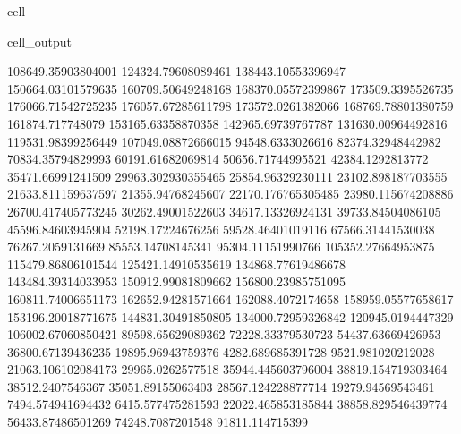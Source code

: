 \documentclass[letterpaper,10pt,english]{jupyterBook}
\begin{document}
\begin{sphinxuseclass}{cell}
\begin{sphinxVerbatimOutput}
\begin{sphinxuseclass}{cell_output}
\begin{sphinxVerbatim}[commandchars=\\\{\}]
108649.35903804001  124324.79608089461  138443.10553396947  150664.03101579635  160709.50649248168  168370.05572399867  173509.3395526735  176066.71542725235  176057.67285611798  173572.0261382066  168769.78801380759  161874.717748079  153165.63358870358  142965.69739767787  131630.00964492816  119531.98399256449  107049.08872666015  94548.6333026616  82374.32948442982  70834.35794829993  60191.61682069814  50656.71744995521  42384.1292813772  35471.66991241509  29963.302930355465  25854.96329230111  23102.898187703555  21633.811159637597  21355.94768245607  22170.176765305485  23980.115674208886  26700.417405773245  30262.49001522603  34617.13326924131  39733.84504086105  45596.84603945904  52198.17224676256  59528.46401019116  67566.31441530038  76267.2059131669  85553.14708145341  95304.11151990766  105352.27664953875  115479.86806101544  125421.14910535619  134868.77619486678  143484.39314033953  150912.99081809662  156800.23985751095  160811.74006651173  162652.94281571664  162088.4072174658  158959.05577658617  153196.20018771675  144831.30491850805  134000.72959326842  120945.0194447329  106002.67060850421  89598.65629089362  72228.33379530723  54437.63669426953  36800.67139436235  19895.96943759376  4282.689685391728  \PYGZhy{}9521.981020212028  \PYGZhy{}21063.106102084173  \PYGZhy{}29965.0262577518  \PYGZhy{}35944.445603796004  \PYGZhy{}38819.154719303464  \PYGZhy{}38512.2407546367  \PYGZhy{}35051.89155063403  \PYGZhy{}28567.124228877714  \PYGZhy{}19279.94569543461  \PYGZhy{}7494.574941694432  6415.577475281593  22022.465853185844  38858.829546439774  56433.87486501269  74248.7087201548  91811.114715399  

\end{sphinxVerbatim}
\end{sphinxuseclass}
\end{sphinxVerbatimOutput}
\end{sphinxuseclass}
\end{document}
